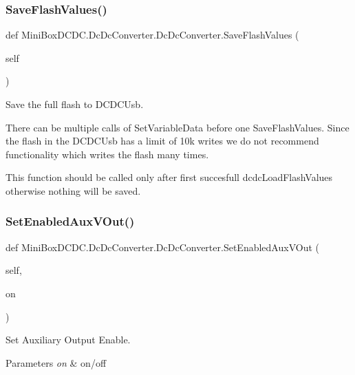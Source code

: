 \subsubsection{\texorpdfstring{Save\+Flash\+Values()}{SaveFlashValues()}}
{\footnotesize\ttfamily def Mini\+Box\+D\+C\+D\+C.\+Dc\+Dc\+Converter.\+Dc\+Dc\+Converter.\+Save\+Flash\+Values (\begin{DoxyParamCaption}\item[{}]{self }\end{DoxyParamCaption})}



Save the full flash to D\+C\+D\+C\+Usb. 

There can be multiple calls of Set\+Variable\+Data before one Save\+Flash\+Values. Since the flash in the D\+C\+D\+C\+Usb has a limit of 10k writes we do not recommend functionality which writes the flash many times.

This function should be called only after first succesfull dcdc\+Load\+Flash\+Values otherwise nothing will be saved. \mbox{\label{class_mini_box_d_c_d_c_1_1_dc_dc_converter_1_1_dc_dc_converter_a0a72410596910b622eeb87b1c7aea13d}} 
\subsubsection{\texorpdfstring{Set\+Enabled\+Aux\+V\+Out()}{SetEnabledAuxVOut()}}
{\footnotesize\ttfamily def Mini\+Box\+D\+C\+D\+C.\+Dc\+Dc\+Converter.\+Dc\+Dc\+Converter.\+Set\+Enabled\+Aux\+V\+Out (\begin{DoxyParamCaption}\item[{}]{self,  }\item[{}]{on }\end{DoxyParamCaption})}



Set Auxiliary Output Enable. 


\begin{DoxyParams}{Parameters}
{\em on} & on/off \\
\hline
\end{DoxyParams}
\mbox{\label{class_mini_box_d_c_d_c_1_1_dc_dc_converter_1_1_dc_dc_converter_afde90abeae3789288591b9eeca7b26a4}} 
